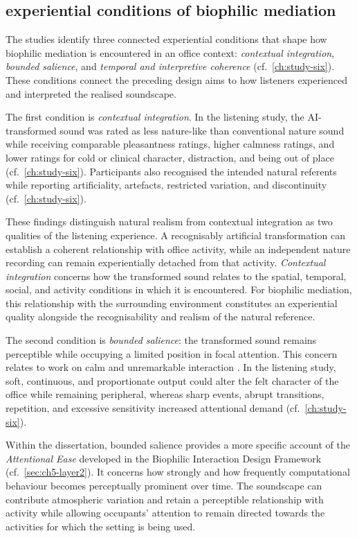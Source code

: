 \subsection{experiential conditions of biophilic mediation}
\label{subsec:moss-experiential-conditions}

The studies identify three connected experiential conditions that shape how biophilic mediation is encountered in an office context: \emph{contextual integration}, \emph{bounded salience}, and \emph{temporal and interpretive coherence} (cf.~\autoref{ch:study-six}). These conditions connect the preceding design aims to how listeners experienced and interpreted the realised soundscape.

The first condition is \emph{contextual integration}. In the listening study, the AI-transformed sound was rated as less nature-like than conventional nature sound while receiving comparable pleasantness ratings, higher calmness ratings, and lower ratings for cold or clinical character, distraction, and being out of place (cf.~\autoref{ch:study-six}). Participants also recognised the intended natural referents while reporting artificiality, artefacts, restricted variation, and discontinuity (cf.~\autoref{ch:study-six}).

These findings distinguish natural realism from contextual integration as two qualities of the listening experience. A recognisably artificial transformation can establish a coherent relationship with office activity, while an independent nature recording can remain experientially detached from that activity. \emph{Contextual integration} concerns how the transformed sound relates to the spatial, temporal, social, and activity conditions in which it is encountered. For biophilic mediation, this relationship with the surrounding environment constitutes an experiential quality alongside the recognisability and realism of the natural reference.

The second condition is \emph{bounded salience}: the transformed sound remains perceptible while occupying a limited position in focal attention. This concern relates to work on calm and unremarkable interaction \cite{case2015calm,tolmie2002unremarkable}. In the listening study, soft, continuous, and proportionate output could alter the felt character of the office while remaining peripheral, whereas sharp events, abrupt transitions, repetition, and excessive sensitivity increased attentional demand (cf.~\autoref{ch:study-six}).

Within the dissertation, bounded salience provides a more specific account of the \emph{Attentional Ease} developed in the Biophilic Interaction Design Framework (cf.~\autoref{sec:ch5-layer2}). It concerns how strongly and how frequently computational behaviour becomes perceptually prominent over time. The soundscape can contribute atmospheric variation and retain a perceptible relationship with activity while allowing occupants' attention to remain directed towards the activities for which the setting is being used.


